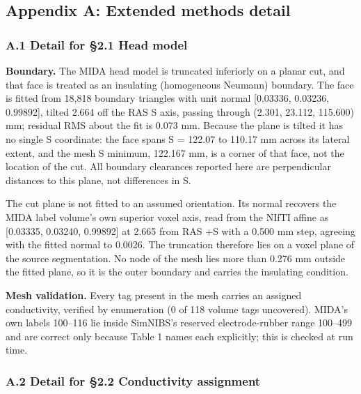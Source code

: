 \documentclass[manuscript,review,anonymous]{acmart}
\begin{document}
\FloatBarrier
\subsection{Appendix A: Extended methods detail}\label{appendix-a-extended-methods-detail}

\subsubsection{A.1 Detail for \S{}2.1 Head model}\label{a.1-detail-for-2.1-head-model}

\textbf{Boundary.} The MIDA head model is truncated inferiorly on a planar cut, and
that face is treated as an insulating (homogeneous Neumann) boundary. The face
is fitted from 18,818 boundary triangles with unit normal {[}\textminus{}0.03336, \textminus{}0.03236,
\textminus{}0.99892{]}, tilted 2.664\textdegree{} off the RAS S axis, passing through (\textminus{}2.301, 23.112,
\textminus{}115.600) mm; residual RMS about the fit is 0.073 mm. Because the plane is
tilted it has no single S coordinate: the face spans S = \textminus{}122.07 to \textminus{}110.17 mm
across its lateral extent, and the mesh S minimum, \textminus{}122.167 mm, is a corner of
that face, not the location of the cut. All boundary clearances reported here
are perpendicular distances to this plane, not differences in S.

The cut plane is not fitted to an assumed orientation. Its normal recovers the
MIDA label volume's own superior voxel axis, read from the NIfTI affine as
{[}0.03335, 0.03240, 0.99892{]} at 2.665\textdegree{} from RAS +S with a 0.500 mm step, agreeing
with the fitted normal to 0.0026\textdegree{}. The truncation therefore lies on a voxel plane
of the source segmentation. No node of the mesh lies more than 0.276 mm outside
the fitted plane, so it is the outer boundary and carries the insulating
condition.

\textbf{Mesh validation.} Every tag present in the mesh carries an assigned
conductivity, verified by enumeration (0 of 118 volume tags uncovered). MIDA's
own labels 100--116 lie inside SimNIBS's reserved electrode-rubber range 100--499
and are correct only because Table 1 names each explicitly; this is checked at
run time.

\subsubsection{A.2 Detail for \S{}2.2 Conductivity assignment}\label{a.2-detail-for-2.2-conductivity-assignment}
\end{document}

